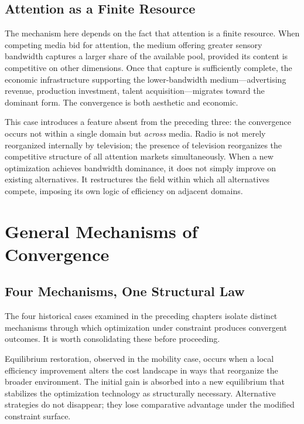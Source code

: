 \documentclass[12pt, oneside]{book}
\theoremstyle{plain}
\theoremstyle{definition}
\theoremstyle{remark}
\theoremstyle{definition}
\begin{document}
\section{Attention as a Finite Resource}

The mechanism here depends on the fact that attention is a finite resource. When
competing media bid for attention, the medium offering greater sensory bandwidth
captures a larger share of the available pool, provided its content is competitive
on other dimensions. Once that capture is sufficiently complete, the economic
infrastructure supporting the lower-bandwidth medium---advertising revenue,
production investment, talent acquisition---migrates toward the dominant form.
The convergence is both aesthetic and economic.

This case introduces a feature absent from the preceding three: the convergence
occurs not within a single domain but \emph{across} media. Radio is not merely
reorganized internally by television; the presence of television reorganizes the
competitive structure of all attention markets simultaneously. When a new optimization
achieves bandwidth dominance, it does not simply improve on existing alternatives.
It restructures the field within which all alternatives compete, imposing its own
logic of efficiency on adjacent domains.

\chapter{General Mechanisms of Convergence}
\label{ch:mechanisms}

\section{Four Mechanisms, One Structural Law}

The four historical cases examined in the preceding chapters isolate distinct
mechanisms through which optimization under constraint produces convergent outcomes.
It is worth consolidating these before proceeding.

Equilibrium restoration, observed in the mobility case, occurs when a local efficiency
improvement alters the cost landscape in ways that reorganize the broader environment.
The initial gain is absorbed into a new equilibrium that stabilizes the optimization
technology as structurally necessary. Alternative strategies do not disappear; they
lose comparative advantage under the modified constraint surface.
\end{document}
